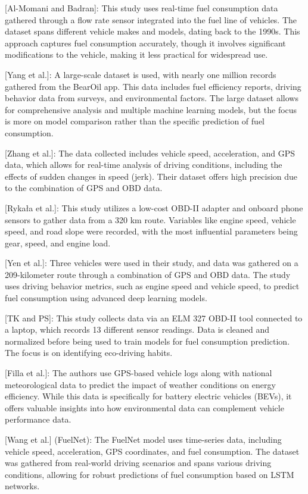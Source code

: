 \documentclass[letterpaper]{article}
\begin{document}
[Al-Momani and Badran]: This study uses real-time fuel consumption data gathered 
through a flow rate sensor integrated into the fuel line of vehicles. The dataset spans 
different vehicle makes and models, dating back to the 1990s. This approach captures fuel
consumption accurately, though it involves significant modifications to the
vehicle, making it less practical for widespread use. 

[Yang et al.]: A large-scale dataset is used, with nearly one million records gathered 
from the BearOil app. This data includes fuel efficiency reports, driving behavior data
from surveys, and environmental factors. The large dataset allows for comprehensive analysis 
and multiple machine learning models, but the focus is more on model comparison rather 
than the specific prediction of fuel consumption.

[Zhang et al.]: The data collected includes vehicle speed, acceleration, and
GPS data, which allows for real-time analysis of driving conditions, including
the effects of sudden changes in speed (jerk). Their dataset offers high
precision due to the combination of GPS and OBD data. 

[Rykała et al.]: This study utilizes a low-cost OBD-II adapter and onboard phone 
sensors to gather data from a 320 km route. Variables like engine speed, vehicle speed, 
and road slope were recorded, with the most influential parameters being gear, speed, and
engine load. 

[Yen et al.]: Three vehicles were used in their study, and data was gathered on a 
209-kilometer route through a combination of GPS and OBD data. The study uses driving 
behavior metrics, such as engine speed and vehicle speed, to predict fuel consumption 
using advanced deep learning models. 

[TK and PS]: This study collects data via an ELM 327 OBD-II tool connected to a laptop, 
which records 13 different sensor readings. Data is cleaned and normalized before being 
used to train models for fuel consumption prediction. The focus is on identifying 
eco-driving habits. 

[Filla et al.]: The authors use GPS-based vehicle logs along with national meteorological 
data to predict the impact of weather conditions on energy efficiency. While this data is 
specifically for battery electric vehicles (BEVs), it offers valuable insights into how
environmental data can complement vehicle performance data. 

[Wang et al.] (FuelNet): The FuelNet model uses time-series data, including vehicle speed,
acceleration, GPS coordinates, and fuel consumption. The dataset was gathered from real-world 
driving scenarios and spans various driving conditions, allowing for robust predictions of 
fuel consumption based on LSTM networks. 
\end{document}
